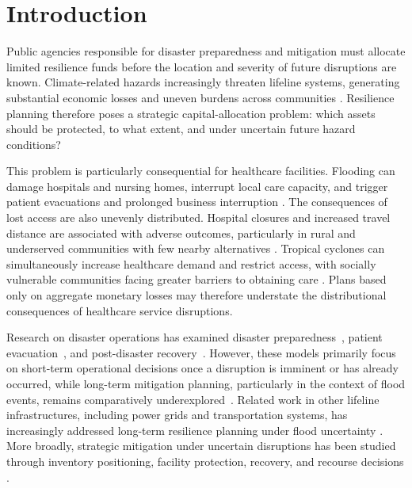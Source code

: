 \documentclass[preprint,11pt,authoryear]{elsarticle}
\begin{document}
\section{Introduction}
\label{sec:introduction}

Public agencies responsible for disaster preparedness and mitigation must
allocate limited resilience funds before the location and severity of future
disruptions are known. Climate-related hazards increasingly threaten lifeline
systems, generating substantial economic losses and uneven burdens across
communities
\citep{noaa_national_centers_for_environmental_information_ncei,
hallegatte_poverty_2020}. Resilience planning therefore poses a strategic
capital-allocation problem: which assets should be protected, to what extent,
and under uncertain future hazard conditions?

This problem is particularly consequential for healthcare facilities. Flooding can
damage hospitals and nursing homes, interrupt local care capacity, and trigger
patient evacuations and prolonged business interruption
\citep{valente_impacts_2026,nhc_harvey_2018}. The consequences of lost access
are also unevenly distributed. Hospital closures and increased travel distance
are associated with adverse outcomes, particularly in rural and underserved
communities with few nearby alternatives
\citep{buchmueller_how_2006,khushalani_impact_2023}. Tropical cyclones can
simultaneously increase healthcare demand and restrict access, with socially
vulnerable communities facing greater barriers to obtaining care
\citep{parks_tropical_2021,rickless_social_2023}. Plans based only on aggregate
monetary losses may therefore understate the distributional consequences of
healthcare service disruptions.



Research on disaster operations has examined disaster preparedness~\citep{uichanco_model_2022}, patient evacuation~\citep{KIM2024104518}, and post-disaster recovery~\citep{castro_markov_2025}. However, these models primarily focus on short-term operational decisions once a disruption is imminent or has already occurred, while long-term mitigation planning, particularly in the context of flood events, remains comparatively underexplored~\citep{gupta_disaster_2016}. Related work in other lifeline infrastructures, including power grids and
transportation systems, has increasingly addressed long-term resilience
planning under flood uncertainty
\citep{TOPLUTUTAY2024102036,shukla_co-optimization_2025,
austgen_comparisons_2025,phouratsamay_strategic_2024}. More broadly, strategic mitigation under
uncertain disruptions has been studied through inventory positioning,
facility protection, recovery, and recourse decisions
\citep{gao_disruption_2019,losada_optimizing_2012,
starita_improving_2022,ansari_two-stage_2025}.
\end{document}
